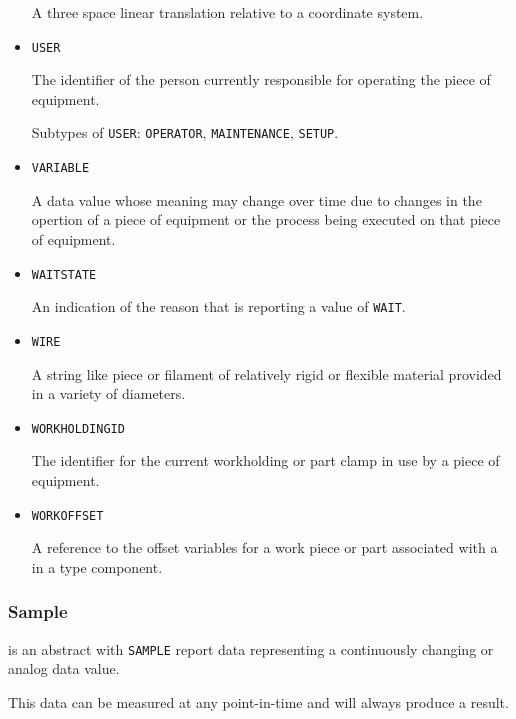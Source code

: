 \begin{itemize}
A three space linear translation relative to a coordinate system.


\item \texttt{USER}  

The identifier of the person currently responsible for operating the piece of equipment.

Subtypes of \texttt{USER}: \texttt{OPERATOR}, \texttt{MAINTENANCE}, \texttt{SET\textunderscore UP}.

\item \texttt{VARIABLE}  

A data value whose meaning may change over time due to changes in the opertion of a piece of equipment or the process being executed on that piece of equipment.


\item \texttt{WAIT\textunderscore STATE}  

An indication of the reason that  is reporting a value of \texttt{WAIT}.


\item \texttt{WIRE}  

A string like piece or filament of relatively rigid or flexible material provided in a variety of diameters.


\item \texttt{WORKHOLDING\textunderscore ID}  

The identifier for the current workholding or part clamp in use by a piece of equipment.


\item \texttt{WORK\textunderscore OFFSET}  

A reference to the offset variables for a work piece or part associated with a  in a  type component.

\end{itemize}



\subsubsection{Sample}
\label{sec:Sample}



 is an abstract  with \texttt{SAMPLE}  report data representing a continuously changing or analog data value.

This data can be measured at any point-in-time and will always produce a result.


